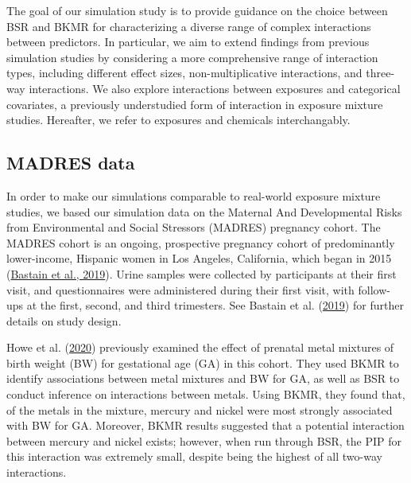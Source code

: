 \documentclass[12pt, twoside]{amherstthesis}
\begin{document}
The goal of our simulation study is to provide guidance on the choice between BSR and BKMR for characterizing a diverse range of complex interactions between predictors. In particular, we aim to extend findings from previous simulation studies by considering a more comprehensive range of interaction types, including different effect sizes, non-multiplicative interactions, and three-way interactions. We also explore interactions between exposures and categorical covariates, a previously understudied form of interaction in exposure mixture studies. Hereafter, we refer to exposures and chemicals interchangably.

\hypertarget{madres}{%
\subsection{MADRES data}\label{madres}}

In order to make our simulations comparable to real-world exposure mixture studies, we based our simulation data on the Maternal And Developmental Risks from Environmental and Social Stressors (MADRES) pregnancy cohort. The MADRES cohort is an ongoing, prospective pregnancy cohort of predominantly lower-income, Hispanic women in Los Angeles, California, which began in 2015 (\protect\hyperlink{ref-bastain_study_2019}{Bastain et al., 2019}). Urine samples were collected by participants at their first visit, and questionnaires were administered during their first visit, with follow-ups at the first, second, and third trimesters. See Bastain et al. (\protect\hyperlink{ref-bastain_study_2019}{2019}) for further details on study design.

Howe et al. (\protect\hyperlink{ref-howe_prenatal_2020}{2020}) previously examined the effect of prenatal metal mixtures of birth weight (BW) for gestational age (GA) in this cohort. They used BKMR to identify associations between metal mixtures and BW for GA, as well as BSR to conduct inference on interactions between metals. Using BKMR, they found that, of the metals in the mixture, mercury and nickel were most strongly associated with BW for GA. Moreover, BKMR results suggested that a potential interaction between mercury and nickel exists; however, when run through BSR, the PIP for this interaction was extremely small, despite being the highest of all two-way interactions.
\end{document}
